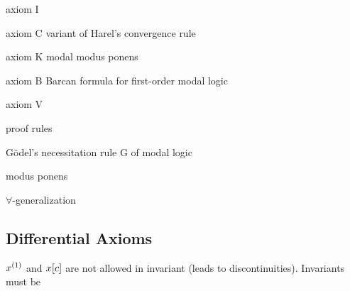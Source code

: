 \documentclass[10pt]{report}
\begin{document}
    axiom I

    axiom C
    variant of Harel's convergence rule

    axiom K
    modal modus ponens

    axiom B
    Barcan formula for first-order modal logic

    axiom V

    proof rules

    Gödel's necessitation rule G of modal logic

    modus ponens

    $\forall$-generalization


    \subsection{Differential Axioms}
        \label{sec:differential-axioms}
    
        \begin{calculus}

        
        \end{calculus}

        $\D{x}$ and $x[c]$ are not allowed in invariant (leads to discontinuities). Invariants must be \FOLR
\end{document}
